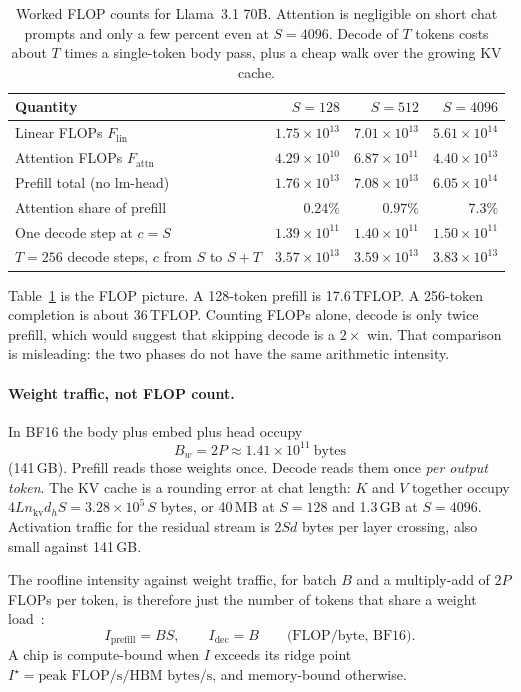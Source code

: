 \begin{table}[t]
\centering
\caption{Worked FLOP counts for Llama~3.1 70B. Attention is negligible on short chat prompts and only a few percent even at $S=4096$. Decode of $T$ tokens costs about $T$ times a single-token body pass, plus a cheap walk over the growing KV cache.}
\label{tab:flops}
\small
\begin{tabular}{@{}lrrr@{}}
\toprule
Quantity & $S{=}128$ & $S{=}512$ & $S{=}4096$ \\
\midrule
Linear FLOPs $F_{\mathrm{lin}}$ & $1.75\times 10^{13}$ & $7.01\times 10^{13}$ & $5.61\times 10^{14}$ \\
Attention FLOPs $F_{\mathrm{attn}}$ & $4.29\times 10^{10}$ & $6.87\times 10^{11}$ & $4.40\times 10^{13}$ \\
Prefill total (no lm-head) & $1.76\times 10^{13}$ & $7.08\times 10^{13}$ & $6.05\times 10^{14}$ \\
Attention share of prefill & $0.24\%$ & $0.97\%$ & $7.3\%$ \\
One decode step at $c{=}S$ & $1.39\times 10^{11}$ & $1.40\times 10^{11}$ & $1.50\times 10^{11}$ \\
$T{=}256$ decode steps, $c$ from $S$ to $S{+}T$ & $3.57\times 10^{13}$ & $3.59\times 10^{13}$ & $3.83\times 10^{13}$ \\
\bottomrule
\end{tabular}
\end{table}

Table~\ref{tab:flops} is the FLOP picture. A 128-token prefill is 17.6\,TFLOP. A 256-token completion is about 36\,TFLOP. Counting FLOPs alone, decode is only twice prefill, which would suggest that skipping decode is a $2\times$ win. That comparison is misleading: the two phases do not have the same arithmetic intensity.

\paragraph{Weight traffic, not FLOP count.}
In BF16 the body plus embed plus head occupy
\[
B_w = 2P \approx 1.41\times 10^{11}\ \text{bytes}
\]
(141\,GB). Prefill reads those weights once. Decode reads them once \emph{per output token}. The KV cache is a rounding error at chat length: $K$ and $V$ together occupy $4Ln_{\mathrm{kv}}d_hS=3.28\times 10^5\,S$ bytes, or 40\,MB at $S=128$ and 1.3\,GB at $S=4096$. Activation traffic for the residual stream is $2Sd$ bytes per layer crossing, also small against 141\,GB.

The roofline intensity against weight traffic, for batch $B$ and a multiply-add of $2P$ FLOPs per token, is therefore just the number of tokens that share a weight load~\citep{williams2009roofline,pope2023efficiently}:
\begin{equation}
\label{eq:intensity}
I_{\mathrm{prefill}} = BS, \qquad I_{\mathrm{dec}} = B
\qquad\text{(FLOP/byte, BF16)}.
\end{equation}
A chip is compute-bound when $I$ exceeds its ridge point $I^\star=\text{peak FLOP/s}/\text{HBM bytes/s}$, and memory-bound otherwise.

